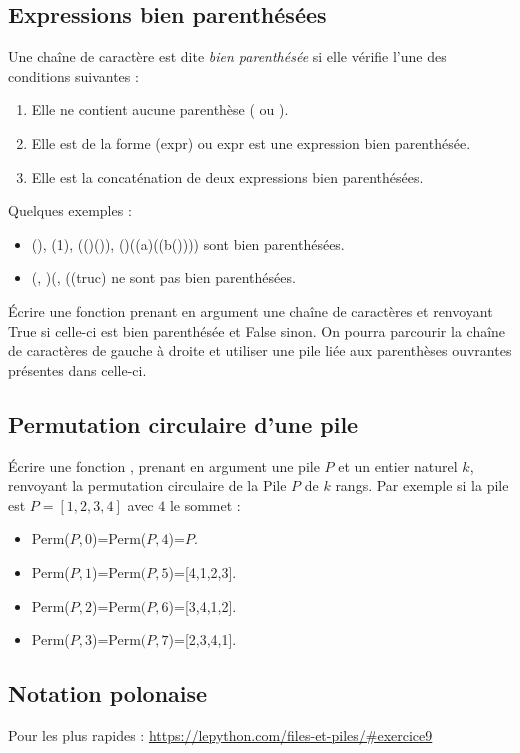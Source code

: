 \documentclass[french,11pt,twoside]{VcCours}
\begin{document}
\subsection{Expressions bien parenthésées}
Une chaîne de caractère est dite \textit{bien parenthésée} si elle vérifie
l'une des conditions suivantes :
\medskip
\begin{enumerate}
\item Elle ne contient aucune parenthèse ( ou ).
\item Elle est de la forme (expr) ou expr est une expression bien parenthésée.
\item Elle est la concaténation de deux expressions bien parenthésées.
\end{enumerate}

\medskip

Quelques exemples :
\begin{itemize}
\item (), (1), (()()), ()((a)((b()))) sont bien parenthésées.
\item (, )(, ((truc) ne sont pas bien parenthésées.
\end{itemize}

\medskip

Écrire une fonction  prenant en argument une chaîne de caractères et 
renvoyant True si celle-ci est bien parenthésée et False sinon. On pourra 
parcourir la chaîne de caractères de gauche à droite et utiliser une pile liée 
aux parenthèses ouvrantes présentes dans celle-ci.


\subsection{Permutation circulaire d'une pile}
Écrire une fonction , prenant en argument une pile $P$ et un entier 
naturel $k$, renvoyant la permutation circulaire de la Pile $P$ de $k$ rangs. 
Par exemple si la pile est $P=[1,2,3,4]$ avec $4$ le sommet :

\begin{itemize}
\item Perm($P,0$)=Perm($P,4$)=$P$.
\item Perm($P,1$)=Perm$(P,5$)=[4,1,2,3].
\item Perm($P,2$)=Perm$(P,6$)=[3,4,1,2].
\item Perm($P,3$)=Perm$(P,7$)=[2,3,4,1].
\end{itemize} 

\subsection{Notation polonaise}
Pour les plus rapides : \url{https://lepython.com/files-et-piles/#exercice9}
\end{document}
